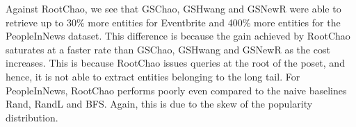 Against RootChao, we see that GSChao, GSHwang and GSNewR were able to retrieve up to 30\% more entities for Eventbrite and 400\% more entities for the PeopleInNews dataset. This difference is because the gain achieved by RootChao saturates at a faster rate than GSChao, GSHwang and GSNewR as the cost increases. This is because RootChao issues queries at the root of the poset, and hence, it is not able to extract entities belonging to the long tail. For PeopleInNews, RootChao performs poorly even compared to the naive baselines Rand, RandL and BFS. Again, this is due to the skew of the popularity distribution.

\begin{figure}
\vspace{-10pt}
\begin{center}

\end{center}
\end{figure}

